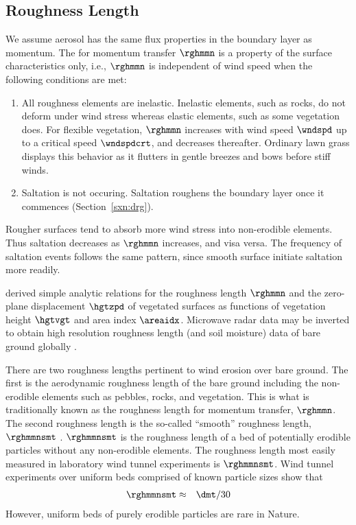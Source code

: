 \documentclass[12pt,twoside]{book}
\begin{document}
\subsection[Roughness Length]{Roughness Length}\label{sxn:rgh}
We assume aerosol has the same flux properties in the boundary layer
as momentum.
The  for momentum transfer $\rghmmn$ is a 
property of the surface characteristics only, i.e., $\rghmmn$ is
independent of wind speed when the following conditions are met:
\begin{enumerate}
\item All roughness elements are inelastic.
Inelastic elements, such as rocks, do not deform under wind stress 
whereas elastic elements, such as some vegetation does.
For flexible vegetation, $\rghmmn$ increases with wind speed
$\wndspd$ up to a critical speed $\wndspdcrt$, and decreases
thereafter. 
Ordinary lawn grass displays this behavior as it flutters in gentle
breezes and bows before stiff winds.
\item Saltation is not occuring. 
Saltation roughens the boundary layer once it commences
(Section~\ref{sxn:drg}).
\end{enumerate}
Rougher surfaces tend to absorb more wind stress into non-erodible
elements. 
Thus saltation decreases as $\rghmmn$ increases, and visa versa.
The frequency of saltation events follows the same pattern, since
smooth surface initiate saltation more readily. 

\cite{Rau94} derived simple analytic relations for the roughness
length $\rghmmn$ and the zero-plane displacement $\hgtzpd$ of
vegetated surfaces as functions of vegetation height $\hgtvgt$ and
area index $\areaidx$.
Microwave radar data may be inverted to obtain high resolution
roughness length (and soil moisture) data of bare ground globally
\cite[e.g.,][]{PRM99,LRG99,ZrD03}. 

There are two roughness lengths pertinent to wind erosion over bare
ground.
The first is the aerodynamic roughness length of the bare ground
including the non-erodible elements such as pebbles, rocks, and
vegetation. 
This is what is traditionally known as the roughness length for
momentum transfer, $\rghmmn$.
The second roughness length is the so-called ``smooth'' roughness
length, $\rghmmnsmt$ \cite[]{MaB95}.
$\rghmmnsmt$ is the roughness length of a bed of potentially erodible 
particles without any non-erodible elements. 
The roughness length most easily measured in laboratory wind
tunnel experiments is $\rghmmnsmt$.
Wind tunnel experiments over uniform beds comprised of known particle
sizes show that 
\begin{eqnarray}
\rghmmnsmt & \approx & \dmt / 30 %
\label{eqn:rgh_mmn_smt_dfn}
\end{eqnarray}
However, uniform beds of purely erodible particles are rare in
Nature. 
\end{document}
